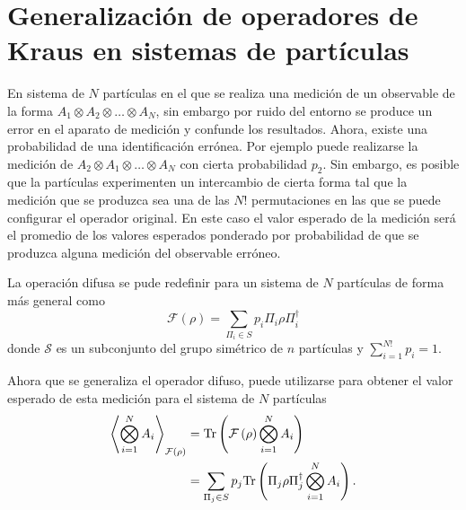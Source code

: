 \documentclass[12pt,oneside]{book}\raggedbottom{}
\begin{document}
\newcommand{\myName}{Condiciones para que los instrumentos cu\'anticos sean equivalentes}
\newcommand{\myDate}{Primer semestre 2021}
\newcommand{\myCourse}{}
\newcommand{\degre}{\ensuremath{^\circ}}
\newcommand{\R}{\mathbb{R}}
\newcommand{\vi}{\mathbf{\hat{\i}}}
\newcommand{\vj}{\mathbf{\hat{\j}}}
\newcommand{\vk}{\mathbf{\hat{\k}}}
\newcommand{\tensor}{\otimes}
\newcommand{\prodtensor}{\bigotimes_{i=1}^{N}}
\newcommand{\fuzzy}[1]{\mathcal{F}\left(#1\right)}
\newcommand{\fuzzydagger}[1]{\mathcal{F}^{\dagger}\left(#1\right)}
\newcommand{\permut}[2]{\Pi_{#1}#2\Pi_{#1}^{\dagger}}
\newcommand{\permutdagger}[2]{\Pi_{#1}^{\dagger}#2\Pi_{#1}}

\section*{Generalización de operadores de Kraus en sistemas de \texorpdfstring{}{N} partículas}



En sistema de $N$ partículas en el que se realiza una medición de un observable de la forma $A_1\tensor A_2\tensor \hdots \tensor A_N$, sin embargo por ruido del entorno se produce un  error en el aparato de medición y confunde los resultados. Ahora, existe una probabilidad de una identificación errónea.  Por ejemplo puede realizarse la medición de $A_2\tensor A_1\tensor \hdots \tensor A_N$ con cierta probabilidad $p_2$. Sin embargo, es posible que la partículas experimenten un intercambio de cierta forma tal que la medición que se produzca sea una de las $N{!}$ permutaciones en las que se puede configurar el operador original. En este caso el valor esperado de la medición será el promedio de los valores esperados  ponderado por probabilidad de que se produzca alguna medición del observable erróneo. 

La operación difusa se pude redefinir para un sistema de $N$ partículas de forma más general como\begin{equation}\label{eq:fm-nparticles}
   \fuzzy{\rho}=\sum_{\Pi_i\in S}p_{i}\permut{i}{\rho}
\end{equation}donde $\mathcal{S}$ es un subconjunto del grupo simétrico de $n$ partículas y $\sum_{i=1}^{N!} p_i=1$. 

Ahora que se generaliza el operador difuso, puede utilizarse para obtener el valor esperado de esta medición para el sistema de $N$ partículas \begin{equation}\label{eq:ExpectedValue-generalForm}\begin{split}
    \left \langle \prodtensor A_i\right \rangle_{\mathcal{F}(\rho)} &=\tr\left(\fuzzy{\rho}\prodtensor A_i\right)\\
    &=\sum_{\Pi_j \in S}p_{j}\tr \left(\permut{j}{\rho} \prodtensor A_i\right).
\end{split}
\end{equation}  
\end{document}
